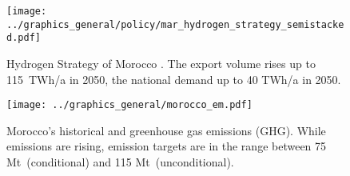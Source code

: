 \begin{figure}
    \centering
    \texttt{[image: ../graphics\_general/policy/mar\_hydrogen\_strategy\_semistacked.pdf]}
    \caption{Hydrogen Strategy of Morocco \cite{MarHyStrat2021}. The export volume rises up to 115~TWh/a in 2050, the national demand up to 40 TWh/a in 2050.}
    \label{fig:mar_hydrogen_strategy}
\end{figure}


\begin{figure}[h!]
    \centering
    \texttt{[image: ../graphics\_general/morocco\_em.pdf]}
    \caption{Morocco's historical \co and greenhouse gas emissions (GHG). While emissions are rising, emission targets are in the range between 75 Mt\coe\ (conditional) and 115 Mt\coe\ (unconditional).}
    \label{fig:morocco_em}
\end{figure}
